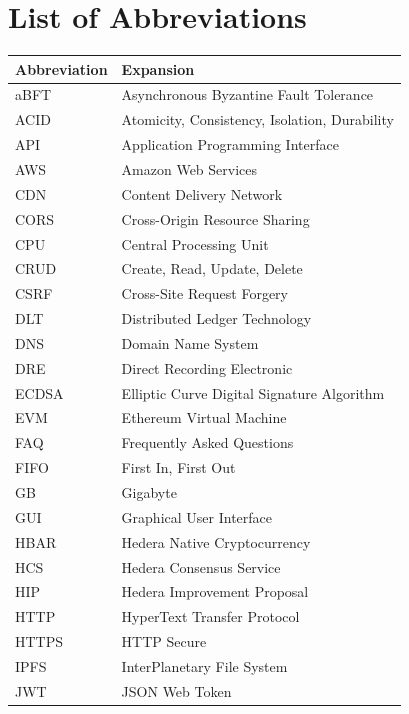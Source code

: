 \chapter*{List of Abbreviations}
\thispagestyle{plain}

\begin{longtable}{@{}p{3.5cm} p{12.5cm}@{}}
\toprule
\textbf{Abbreviation} & \textbf{Expansion} \\
\midrule
\endhead

aBFT & Asynchronous Byzantine Fault Tolerance \\
ACID & Atomicity, Consistency, Isolation, Durability \\
API & Application Programming Interface \\
AWS & Amazon Web Services \\
CDN & Content Delivery Network \\
CORS & Cross-Origin Resource Sharing \\
CPU & Central Processing Unit \\
CRUD & Create, Read, Update, Delete \\
CSRF & Cross-Site Request Forgery \\
DLT & Distributed Ledger Technology \\
DNS & Domain Name System \\
DRE & Direct Recording Electronic \\
ECDSA & Elliptic Curve Digital Signature Algorithm \\
EVM & Ethereum Virtual Machine \\
FAQ & Frequently Asked Questions \\
FIFO & First In, First Out \\
GB & Gigabyte \\
GUI & Graphical User Interface \\
HBAR & Hedera Native Cryptocurrency \\
HCS & Hedera Consensus Service \\
HIP & Hedera Improvement Proposal \\
HTTP & HyperText Transfer Protocol \\
HTTPS & HTTP Secure \\
IPFS & InterPlanetary File System \\
JWT & JSON Web Token \\

\end{longtable}
